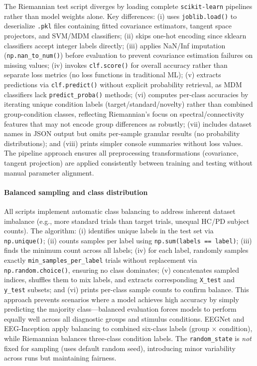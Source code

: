 \documentclass[12pt]{report}
\begin{document}
The Riemannian test script diverges by loading complete \texttt{scikit-learn} pipelines rather than model weights alone. Key differences: (i) uses \texttt{joblib.load()} to deserialize \texttt{.pkl} files containing fitted covariance estimators, tangent space projectors, and SVM/MDM classifiers; (ii) skips one-hot encoding since sklearn classifiers accept integer labels directly; (iii) applies NaN/Inf imputation (\texttt{np.nan\_to\_num()}) before evaluation to prevent covariance estimation failures on missing values; (iv) invokes \texttt{clf.score()} for overall accuracy rather than separate loss metrics (no loss functions in traditional ML); (v) extracts predictions via \texttt{clf.predict()} without explicit probability retrieval, as MDM classifiers lack \texttt{predict\_proba()} methods; (vi) computes per-class accuracies by iterating unique condition labels (target/standard/novelty) rather than combined group-condition classes, reflecting Riemannian's focus on spectral/connectivity features that may not encode group differences as robustly; (vii) includes dataset names in JSON output but omits per-sample granular results (no probability distributions); and (viii) prints simpler console summaries without loss values. The pipeline approach ensures all preprocessing transformations (covariance, tangent projection) are applied consistently between training and testing without manual parameter alignment.

\paragraph{Balanced sampling and class distribution}\mbox{}

All scripts implement automatic class balancing to address inherent dataset imbalance (e.g., more standard trials than target trials, unequal HC/PD subject counts). The algorithm: (i) identifies unique labels in the test set via \texttt{np.unique()}; (ii) counts samples per label using \texttt{np.sum(labels == label)}; (iii) finds the minimum count across all labels; (iv) for each label, randomly samples exactly \texttt{min\_samples\_per\_label} trials without replacement via \texttt{np.random.choice()}, ensuring no class dominates; (v) concatenates sampled indices, shuffles them to mix labels, and extracts corresponding \texttt{X\_test} and \texttt{y\_test} subsets; and (vi) prints per-class sample counts to confirm balance. This approach prevents scenarios where a model achieves high accuracy by simply predicting the majority class—balanced evaluation forces models to perform equally well across all diagnostic groups and stimulus conditions. EEGNet and EEG-Inception apply balancing to combined six-class labels (group × condition), while Riemannian balances three-class condition labels. The \texttt{random\_state} is \textit{not} fixed for sampling (uses default random seed), introducing minor variability across runs but maintaining fairness.
\end{document}
